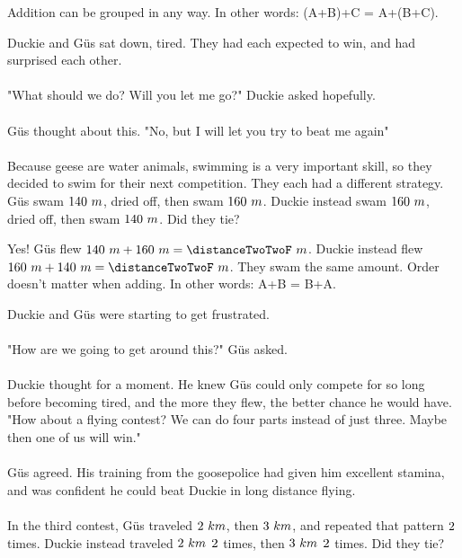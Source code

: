 {Addition can be grouped in any way. In other words: (A+B)+C = A+(B+C).}
{}
{Duckie and G{\"u}s sat down, tired. They had each expected to win, and had surprised each other. 
\paragraph{} "What should we do? Will you let me go?" Duckie asked hopefully. \paragraph{} G{\"u}s thought about this. "No, but I will let you try to beat me again" 
\paragraph{} Because geese are water animals, swimming is a very important skill, so they decided to swim for their next competition. They each had a different strategy. G{\"u}s swam $140~m$, dried off, then swam $160~m$. Duckie instead swam $160~m$, dried off, then swam $140~m$. Did they tie?}
{Yes! G{\"u}s flew $\distanceTwoTwoO~m + \distanceTwoTwoTw~m = \distanceTwoTwoF~m$. Duckie instead flew $\distanceTwoTwoTw~m + \distanceTwoTwoO~m = \distanceTwoTwoF~m$. They swam the same amount.}
{Order doesn't matter when adding. In other words: A+B = B+A.}
{}
{Duckie and G{\"u}s were starting to get frustrated. 
\paragraph{} "How are we going to get around this?" G{\"u}s asked.
\paragraph{} Duckie thought for a moment. He knew G{\"u}s could only compete for so long before becoming tired, and the more they flew, the better chance he would have. "How about a flying contest? We can do four parts instead of just three. Maybe then one of us will win."
\paragraph{} G{\"u}s agreed. His training from the goosepolice had given him excellent stamina, and was confident he could beat Duckie in long distance flying. 
\paragraph{} In the third contest, G{\"u}s traveled $2~km$, then $3~km$, and repeated that pattern $2$ times. Duckie instead traveled $2~km$ $2$ times, then $3~km$ $2$ times. Did they tie?}
